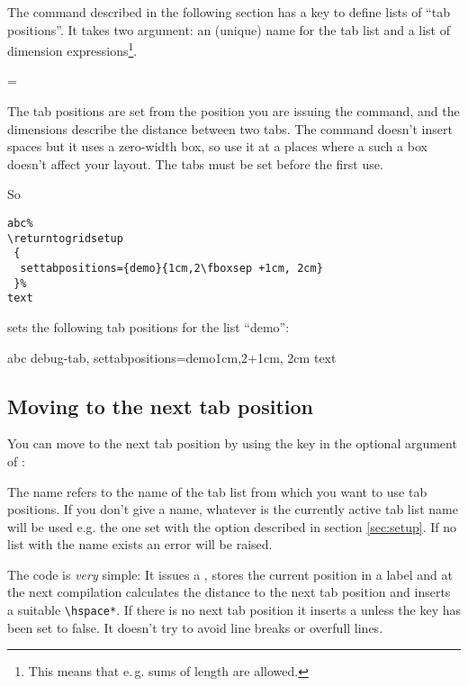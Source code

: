 \documentclass[twoside,parskip=half-,fontsize=12pt,egregdoesnotlikesansseriftitles,headings=normal]{scrartcl}
\begin{document}
The  command described in the following section has a key to define lists of \enquote{tab positions}. It takes two argument: an (unique) name for the tab list and a list of dimension expressions\footnote{This means that e.\,g. sums of length are allowed.}.

=

The tab positions are set from the position you are issuing the command, and the dimensions describe the distance between two tabs. The command doesn't insert spaces but it uses a zero-width box, so use it at a places where a such a box doesn't affect your layout. The tabs must be set before the first use.


So

\begin{lstlisting}
abc%
\returntogridsetup
 {
  settabpositions={demo}{1cm,2\fboxsep +1cm, 2cm}
 }%
text
\end{lstlisting}

sets the following tab positions for the list \enquote{demo}:

abc%
\returntogridsetup
 {
  debug-tab,
  settabpositions={demo}{1cm,2\fboxsep +1cm, 2cm}
 }%
text

\subsection{Moving to the next tab position}

You can move to the next tab position by using the  key in the optional argument of :


\Macro\returntogrid[tab=\meta{name}]


The name refers to the name of the tab list from which you want to use tab positions. If you don't give a name, whatever is the currently active tab list name  will be used e.g. the one set with the  option described in section \ref{sec:setup}. If no list with the name exists an error will be raised.

The code is \emph{very} simple: It issues a , stores the current position in a label and at the next compilation calculates the distance to the next tab position and inserts a suitable \verb+\hspace*+. If there is no next tab position it inserts a  unless the key  has been set to false. It doesn't try to avoid line breaks or overfull lines.
\end{document}
